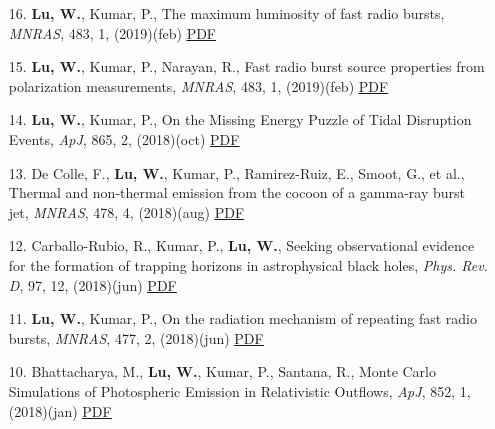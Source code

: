 \begin{itemize}[leftmargin=0.65cm]
\vspace{-0.1cm}
\item[16.]{{\bf Lu, W.}, Kumar, P., {The maximum luminosity of fast radio bursts}, {\it MNRAS}, 483, 1, (2019)(feb) \href{https://ui.adsabs.harvard.edu/abs/2019MNRAS.483L..93L}{\underline{PDF}}}

\vspace{-0.1cm}
\item[15.]{{\bf Lu, W.}, Kumar, P., Narayan, R., {Fast radio burst source properties from polarization measurements}, {\it MNRAS}, 483, 1, (2019)(feb) \href{https://ui.adsabs.harvard.edu/abs/2019MNRAS.483..359L}{\underline{PDF}}}

\vspace{-0.1cm}
\item[14.]{{\bf Lu, W.}, Kumar, P., {On the Missing Energy Puzzle of Tidal Disruption Events}, {\it ApJ}, 865, 2, (2018)(oct) \href{https://ui.adsabs.harvard.edu/abs/2018ApJ...865..128L}{\underline{PDF}}}

\vspace{-0.1cm}
\item[13.]{De Colle, F., {\bf Lu, W.}, Kumar, P., Ramirez-Ruiz, E., Smoot, G., et al., {Thermal and non-thermal emission from the cocoon of a gamma-ray burst jet}, {\it MNRAS}, 478, 4, (2018)(aug) \href{https://ui.adsabs.harvard.edu/abs/2018MNRAS.478.4553D}{\underline{PDF}}}

\vspace{-0.1cm}
\item[12.]{Carballo-Rubio, R., Kumar, P., {\bf Lu, W.}, {Seeking observational evidence for the formation of trapping horizons in astrophysical black holes}, {\it Phys. Rev. D}, 97, 12, (2018)(jun) \href{https://ui.adsabs.harvard.edu/abs/2018PhRvD..97l3012C}{\underline{PDF}}}

\vspace{-0.1cm}
\item[11.]{{\bf Lu, W.}, Kumar, P., {On the radiation mechanism of repeating fast radio bursts}, {\it MNRAS}, 477, 2, (2018)(jun) \href{https://ui.adsabs.harvard.edu/abs/2018MNRAS.477.2470L}{\underline{PDF}}}

\vspace{-0.1cm}
\item[10.]{Bhattacharya, M., {\bf Lu, W.}, Kumar, P., Santana, R., {Monte Carlo Simulations of Photospheric Emission in Relativistic Outflows}, {\it ApJ}, 852, 1, (2018)(jan) \href{https://ui.adsabs.harvard.edu/abs/2018ApJ...852...24B}{\underline{PDF}}}


\end{itemize}
